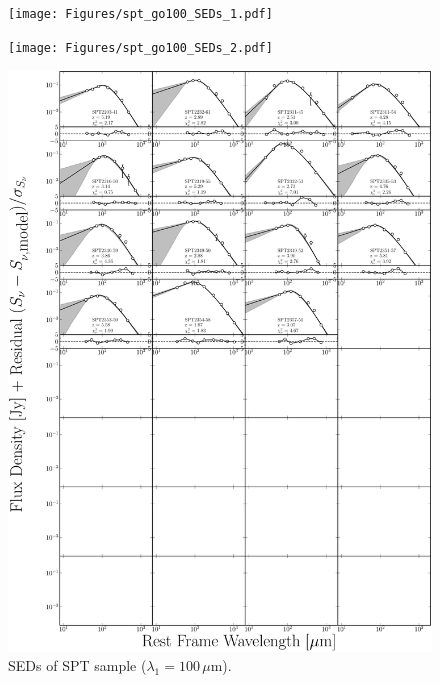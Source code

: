 \begin{figure}
	\centering
	\texttt{[image: Figures/spt\_go100\_SEDs\_1.pdf]}
\end{figure}
\begin{figure}
	\centering
	\texttt{[image: Figures/spt\_go100\_SEDs\_2.pdf]}
\end{figure}
\begin{figure}
	\centering
	\includegraphics[width=\columnwidth]{Figures/spt_go100_SEDs_3.pdf}
	\caption[SEDs of SPT sample ($\lambda_1 = 100\,\mu$m)]{SEDs of SPT sample ($\lambda_1 = 100\,\mu$m).}
\end{figure}


